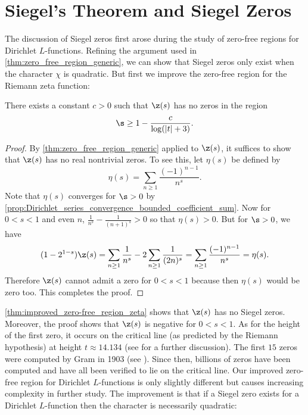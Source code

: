   \section{Siegel's Theorem and Siegel Zeros}
    The discussion of Siegel zeros first arose during the study of zero-free regions for Dirichlet \(L\)-functions. Refining the argument used in \cref{thm:zero_free_region_generic}, we can show that Siegel zeros only exist when the character \(\chi\) is quadratic. But first we improve the zero-free region for the Riemann zeta function:

    \begin{theorem}\label{thm:improved_zero-free_region_zeta}
      There exists a constant \(c > 0\) such that \(\z(s)\) has no zeros in the region
      \[
        \s \ge 1-\frac{c}{\log(|t|+3)}.
      \]
    \end{theorem}
    \begin{proof}
      By \cref{thm:zero_free_region_generic} applied to \(\z(s)\), it suffices to show that \(\z(s)\) has no real nontrivial zeros. To see this, let \(\eta(s)\) be defined by
      \[
        \eta(s) = \sum_{n \ge 1}\frac{(-1)^{n-1}}{n^{s}}.
      \]
      Note that \(\eta(s)\) converges for \(\s > 0\) by \cref{prop:Dirichlet_series_convergence_bounded_coefficient_sum}. Now for \(0 < s < 1\) and even \(n\), \(\frac{1}{n^{s}}-\frac{1}{(n+1)^{s}} > 0\) so that \(\eta(s) > 0\). But for \(\s > 0\), we have
      \[
        (1-2^{1-s})\z(s) = \sum_{n \ge 1}\frac{1}{n^{s}}-2\sum_{n \ge 1}\frac{1}{(2n)^{s}} = \sum_{n \ge 1}\frac{(-1)^{n-1}}{n^{s}} = \eta(s).
      \]
      Therefore \(\z(s)\) cannot admit a zero for \(0 < s < 1\) because then \(\eta(s)\) would be zero too. This completes the proof.
    \end{proof}

    \cref{thm:improved_zero-free_region_zeta} shows that \(\z(s)\) has no Siegel zeros. Moreover, the proof shows that \(\z(s)\) is negative for \(0 < s < 1\). As for the height of the first zero, it occurs on the critical line (as predicted by the Riemann hypothesis) at height \(t \approx 14.134\) (see \cite{davenport1980multiplicative} for a further discussion). The first \(15\) zeros were computed by Gram in 1903 (see \cite{gram1903note}). Since then, billions of zeros have been computed and have all been verified to lie on the critical line. Our improved zero-free region for Dirichlet \(L\)-functions is only slightly different but causes increasing complexity in further study. The improvement is that if a Siegel zero exists for a Dirichlet \(L\)-function then the character is necessarily quadratic:

